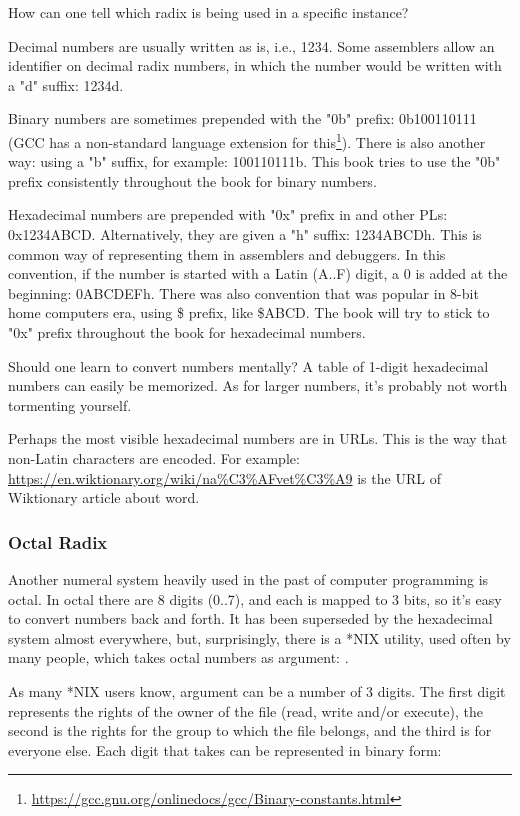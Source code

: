 How can one tell which radix is being used in a specific instance?

Decimal numbers are usually written as is, i.e., 1234. Some assemblers allow an identifier on decimal radix numbers, in which the number would be written with a "d" suffix: 1234d.

Binary numbers are sometimes prepended with the "0b" prefix: 0b100110111 (\ac{GCC} has a non-standard language extension for this\footnote{\url{https://gcc.gnu.org/onlinedocs/gcc/Binary-constants.html}}).
There is also another way: using a "b" suffix, for example: 100110111b.
This book tries to use the "0b" prefix consistently throughout the book for binary numbers. %

Hexadecimal numbers are prepended with "0x" prefix in \CCpp and other \ac{PL}s: 0x1234ABCD.
Alternatively, they are given a "h" suffix: 1234ABCDh. This is common way of representing them in assemblers and debuggers.
In this convention, if the number is started with a Latin (A..F) digit, a 0 is added at the beginning: 0ABCDEFh.
There was also convention that was popular in 8-bit home computers era, using \$ prefix, like \$ABCD.
The book will try to stick to "0x" prefix throughout the book for hexadecimal numbers. %

Should one learn to convert numbers mentally? A table of 1-digit hexadecimal numbers can easily be memorized.
As for larger numbers, it's probably not worth tormenting yourself.

Perhaps the most visible hexadecimal numbers are in \ac{URL}s.
This is the way that non-Latin characters are encoded.
For example:
\url{https://en.wiktionary.org/wiki/na\%C3\%AFvet\%C3\%A9} is the \ac{URL} of Wiktionary article about  word.

\subsubsection{Octal Radix}

Another numeral system heavily used in the past of computer programming is octal. In octal there are 8 digits (0..7), and each is mapped to 3 bits, so it's easy to convert numbers back and forth.
It has been superseded by the hexadecimal system almost everywhere, but, surprisingly, there is a *NIX utility, used often by many people, which takes octal numbers as argument: .

As many *NIX users know,  argument can be a number of 3 digits. The first digit represents the rights of the owner of the file (read, write and/or execute), the second is the rights for the group to which the file belongs, and the third is for everyone else.
Each digit that  takes can be represented in binary form:

